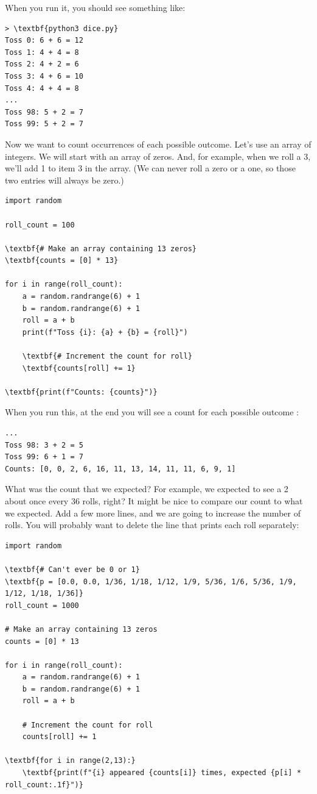 When you run it, you should see something like:
\begin{Verbatim}[commandchars=\\\{\}]
> \textbf{python3 dice.py}
Toss 0: 6 + 6 = 12
Toss 1: 4 + 4 = 8
Toss 2: 4 + 2 = 6
Toss 3: 4 + 6 = 10
Toss 4: 4 + 4 = 8
...
Toss 98: 5 + 2 = 7
Toss 99: 5 + 2 = 7
\end{Verbatim}

Now we want to count occurrences of each possible outcome. Let's use an
array of integers. We will start with an array of zeros. And, for
example, when we roll a 3, we'll add 1 to item 3 in the array. (We can
never roll a zero or a one, so those two entries will always be zero.)
\begin{Verbatim}[commandchars=\\\{\}]
import random

roll_count = 100

\textbf{# Make an array containing 13 zeros}
\textbf{counts = [0] * 13}

for i in range(roll_count):
    a = random.randrange(6) + 1
    b = random.randrange(6) + 1
    roll = a + b
    print(f"Toss {i}: {a} + {b} = {roll}")

    \textbf{# Increment the count for roll}
    \textbf{counts[roll] += 1}

\textbf{print(f"Counts: {counts}")}
\end{Verbatim}

When you run this, at the end you will see a count for each possible outcome :

\begin{Verbatim}
...
Toss 98: 3 + 2 = 5
Toss 99: 6 + 1 = 7
Counts: [0, 0, 2, 6, 16, 11, 13, 14, 11, 11, 6, 9, 1]
\end{Verbatim}

What was the count that we expected? For example, we expected to see a
2 about once every 36 rolls, right? It might be nice to compare our
count to what we expected. Add a few more lines, and we are going to
increase the number of rolls. You will probably want to delete the
line that prints each roll separately:

\begin{Verbatim}[commandchars=\\\{\}]
import random

\textbf{# Can't ever be 0 or 1}
\textbf{p = [0.0, 0.0, 1/36, 1/18, 1/12, 1/9, 5/36, 1/6, 5/36, 1/9, 1/12, 1/18, 1/36]}
roll_count = 1000

# Make an array containing 13 zeros
counts = [0] * 13

for i in range(roll_count):
    a = random.randrange(6) + 1
    b = random.randrange(6) + 1
    roll = a + b

    # Increment the count for roll
    counts[roll] += 1

\textbf{for i in range(2,13):}
    \textbf{print(f"{i} appeared {counts[i]} times, expected {p[i] * roll_count:.1f}")}
\end{Verbatim}

